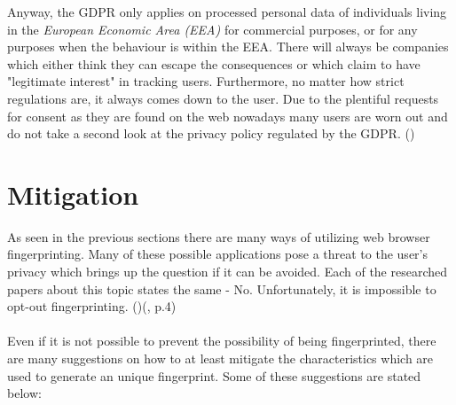 Anyway, the GDPR only applies on processed personal data of individuals living in the \textit{European Economic Area (EEA)} for commercial purposes, or for any purposes when the behaviour is within the EEA. There will always be companies which either think they can escape the consequences or which claim to have "legitimate interest" in tracking users. Furthermore, no matter how strict regulations are, it always comes down to the user. Due to the plentiful requests for consent as they are found on the web nowadays many users are worn out and do not take a second look at the privacy policy regulated by the GDPR. (\textcite{miele18})

\section{Mitigation} \label{mitigation}
As seen in the previous sections there are many ways of utilizing web browser fingerprinting. Many of these possible applications pose a threat to the user's privacy which brings up the question if it can be avoided. Each of the researched papers about this topic states the same - No. Unfortunately, it is impossible to opt-out fingerprinting. (\textcite{web17})(\textcite{upi15}, p.4)\\\\
Even if it is not possible to prevent the possibility of being fingerprinted, there are many suggestions on how to at least mitigate the characteristics which are used to generate an unique fingerprint. Some of these suggestions are stated below:
